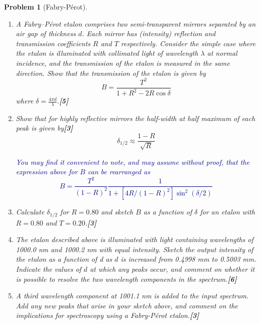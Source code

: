 \documentclass[a4paper]{article}
\theoremstyle{new}
\newtheorem{qns}{Problem}[subsection]
\begin{document}
\begin{qns}[Fabry-Pérot]\leavevmode
\begin{enumerate}[label=(\roman*)]
\item A Fabry–Pérot etalon comprises two semi-transparent mirrors separated by an air gap of thickness $d$. Each mirror has (intensity) reflection and transmission coefficients $R$ and $T$ respectively. Consider the simple case where the etalon is illuminated with collimated light of wavelength $\lambda$ at normal incidence, and the transmission of the etalon is measured in the same direction. Show that the transmission of the etalon is given by
$$B=\frac{T^2}{1+R^2-2R\cos\delta}$$
where $\delta=\frac{4\pi d}{\lambda}$.\hfill\textbf{[5]}
\item Show that for highly reflective mirrors the half-width at half maximum of each peak is given by\hfill\textbf{[3]}
$$\delta_{1/2}\approx\frac{1-R}{\sqrt{R}}$$
\begin{mdframed}
\textcolor{darkblue}{You may find it convenient to note, and may assume without proof, that the expression above for $B$ can be rearranged as
$$B=\frac{T^2}{(1-R)^2}\frac{1}{1+[4R/(1-R)^2]\sin^2(\delta/2)}$$}
\end{mdframed}
\item  Calculate $\delta_{1/2}$ for $R = 0.80$ and sketch $B$ as a function of $\delta$ for an etalon with $R = 0.80$ and $T = 0.20$.\hfill\textbf{[3]}
\item The etalon described above is illuminated with light containing wavelengths of 1000.0 nm and 1000.2 nm with equal intensity. Sketch the output intensity of the etalon as a function of d as $d$ is increased from 0.4998 mm to 0.5003 mm. Indicate the values of $d$ at which any peaks occur, and comment on whether it is possible to resolve the two wavelength components in the spectrum.\hfill\textbf{[6]}
\item A third wavelength component at 1001.1 nm is added to the input spectrum. Add any new peaks that arise in your sketch above, and comment on the implications for spectroscopy using a Fabry-Pérot etalon.\hfill\textbf{[3]}
\end{enumerate}
\end{qns}
\end{document}

